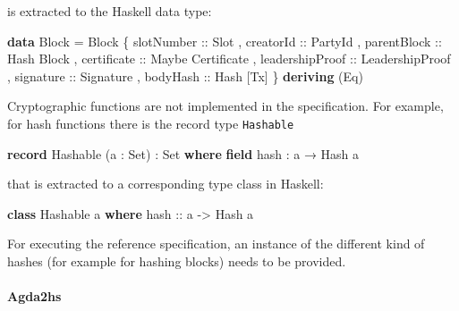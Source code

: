 \documentclass[10pt]{article}
\newenvironment{Shaded}{}{}
\newcommand{\DataTypeTok}[1]{\textcolor[rgb]{0.56,0.13,0.00}{#1}}
\newcommand{\KeywordTok}[1]{\textcolor[rgb]{0.00,0.44,0.13}{\textbf{#1}}}
\newcommand{\NormalTok}[1]{#1}
\newcommand{\OtherTok}[1]{\textcolor[rgb]{0.00,0.44,0.13}{#1}}
\begin{document}
is extracted to the Haskell data type:

\begin{Shaded}
\begin{Highlighting}[]
\KeywordTok{data} \DataTypeTok{Block} \OtherTok{=} \DataTypeTok{Block}
\NormalTok{  \{}\OtherTok{ slotNumber ::} \DataTypeTok{Slot}
\NormalTok{  ,}\OtherTok{ creatorId ::} \DataTypeTok{PartyId}
\NormalTok{  ,}\OtherTok{ parentBlock ::} \DataTypeTok{Hash} \DataTypeTok{Block}
\NormalTok{  ,}\OtherTok{ certificate ::} \DataTypeTok{Maybe} \DataTypeTok{Certificate}
\NormalTok{  ,}\OtherTok{ leadershipProof ::} \DataTypeTok{LeadershipProof}
\NormalTok{  ,}\OtherTok{ signature ::} \DataTypeTok{Signature}
\NormalTok{  ,}\OtherTok{ bodyHash ::} \DataTypeTok{Hash}\NormalTok{ [}\DataTypeTok{Tx}\NormalTok{]}
\NormalTok{  \}}
  \KeywordTok{deriving}\NormalTok{ (}\DataTypeTok{Eq}\NormalTok{)}
\end{Highlighting}
\end{Shaded}

Cryptographic functions are not implemented in the specification. For
example, for hash functions there is the record type \texttt{Hashable}

\begin{Shaded}
\begin{Highlighting}[]
\KeywordTok{record}\NormalTok{ Hashable }\OtherTok{(}\NormalTok{a }\OtherTok{:} \DataTypeTok{Set}\OtherTok{)} \OtherTok{:} \DataTypeTok{Set} \KeywordTok{where}
  \KeywordTok{field}\NormalTok{ hash }\OtherTok{:}\NormalTok{ a }\OtherTok{→}\NormalTok{ Hash a}
\end{Highlighting}
\end{Shaded}

that is extracted to a corresponding type class in Haskell:

\begin{Shaded}
\begin{Highlighting}[]
\KeywordTok{class} \DataTypeTok{Hashable}\NormalTok{ a }\KeywordTok{where}
\OtherTok{  hash ::}\NormalTok{ a }\OtherTok{{-}\textgreater{}} \DataTypeTok{Hash}\NormalTok{ a}
\end{Highlighting}
\end{Shaded}

For executing the reference specification, an instance of the different
kind of hashes (for example for hashing blocks) needs to be provided.

\paragraph{Agda2hs}\label{agda2hs}
\end{document}
